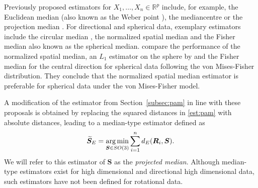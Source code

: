 Previously proposed estimators for $X_1, \ldots,X_n \in \mathbb{R}^p$  include, for example, the Euclidean median (also known as the Weber point \citep{bajaj88}), the mediancentre \citep{gower74} or the projection median \citep{durocher09}. %
For directional and spherical data, exemplary estimators include the circular median \citep{mardia72}, the normalized spatial median \citep{ducharme87} and the Fisher median \citep{fisher85} also known as the spherical median. \citet{chan93} compare the performance of the normalized spatial median,  an $L_1$ estimator on the sphere by \cite{he92} and the Fisher median for the central direction for spherical data following the von Mises-Fisher distribution. They conclude that the normalized spatial median estimator is preferable for spherical data under the von Mises-Fisher model. 

A modification of the estimator from Section~\ref{subsec:pam} in line with these proposals is obtained by replacing the squared distances in \eqref{est:pam} with absolute distances, leading to a median-type estimator defined as
\begin{equation}\label{est:med}
{\widetilde{\bm S}_E}=\operatorname*{arg\,min}_{\bm{S}\in
SO(3)}\sum_{i=1}^n{d_E}(\bm{R}_i,\bm{S}).
\end{equation}
We will refer to this estimator of $\bm{S}$ as the \textit{projected median}.  %
Although median-type estimators exist for high dimensional and directional  high dimensional  data, such estimators have not been defined for rotational data. 


